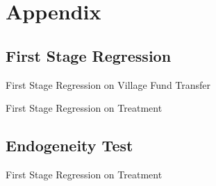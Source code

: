 \documentclass[
11pt,notheorems,compress,hyperref={pdfauthor=Maghfira Ramadhani}
]{beamer}
\begin{document}
\appendix
\section{Appendix}
\subsection{First Stage Regression}
\begin{frame}
\label{FSVF}
    \begin{table}[h]
    \caption{First Stage Regression on Village Fund Transfer \hyperlink{VFclick}{}}
    \scalebox{0.6}{}    
    \end{table}
\end{frame}

\begin{frame}
\label{FSD}
    \begin{table}[h]
    \caption{First Stage Regression on Treatment \hyperlink{Dclick}{}}
    \scalebox{0.55}{}    
    \end{table}
    
\end{frame}

\subsection{Endogeneity Test}
\begin{frame}
\label{Endotest}
    \begin{table}[h]
    \caption{First Stage Regression on Treatment \hyperlink{Dclick}{}}
    \scalebox{0.55}{}    
    \end{table}
    
\end{frame}
\end{document}

